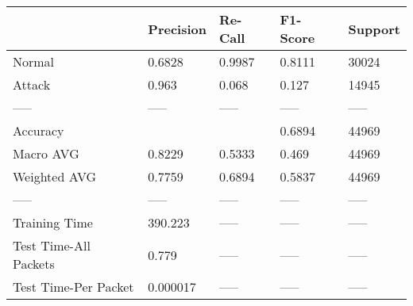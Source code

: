 \begin{tabular}{lllll}
\toprule
{} & Precision & Re-Call & F1-Score & Support \\
\midrule
Normal                &    0.6828 &  0.9987 &   0.8111 &   30024 \\
Attack                &     0.963 &   0.068 &    0.127 &   14945 \\
-----                 &     ----- &   ----- &    ----- &   ----- \\
Accuracy              &           &         &   0.6894 &   44969 \\
Macro AVG             &    0.8229 &  0.5333 &    0.469 &   44969 \\
Weighted AVG          &    0.7759 &  0.6894 &   0.5837 &   44969 \\
-----                 &     ----- &   ----- &    ----- &   ----- \\
Training Time         &   390.223 &   ----- &    ----- &   ----- \\
Test Time-All Packets &     0.779 &   ----- &    ----- &   ----- \\
Test Time-Per Packet  &  0.000017 &   ----- &    ----- &   ----- \\
\bottomrule
\end{tabular}
